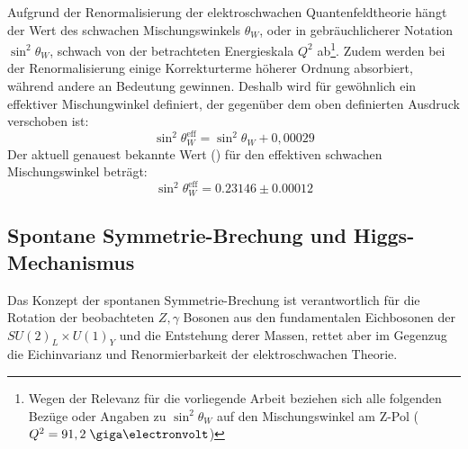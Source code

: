 Aufgrund der Renormalisierung der elektroschwachen Quantenfeldtheorie hängt der
Wert des schwachen Mischungswinkels $\theta_W$, oder in gebräuchlicherer
Notation $\sin^2\theta_W$, schwach von der betrachteten Energieskala $Q^2$
ab\footnote{Wegen der Relevanz für die vorliegende Arbeit beziehen sich alle
folgenden Bezüge oder Angaben zu $\sin^2\theta_W$ auf den Mischungswinkel am
Z-Pol ($Q^2=91,2\GeV$)}. Zudem werden bei der Renormalisierung einige
Korrekturterme höherer Ordnung absorbiert, während andere an Bedeutung
gewinnen. Deshalb wird für gewöhnlich ein effektiver Mischungwinkel definiert,
der gegenüber dem oben definierten Ausdruck verschoben ist:
\begin{equation}
    \sin^2\theta_W^\text{eff} = \sin^2\theta_W + 0,00029
    \label{eq:effective_angle}
\end{equation}
Der aktuell genauest bekannte Wert (\cite{PhysRevD.86.010001}) für den
effektiven schwachen Mischungswinkel beträgt:
\begin{equation}
    \sin^2\theta_W^\text{eff} = 0.23146 \pm 0.00012
    \label{eq:literature_value}
\end{equation}



\subsection{Spontane Symmetrie-Brechung und Higgs-Mechanismus}
Das Konzept der spontanen Symmetrie-Brechung ist verantwortlich für die
Rotation der beobachteten $Z, \gamma$ Bosonen aus den fundamentalen Eichbosonen
der $SU(2)_L \times U(1)_Y$ und die Entstehung derer Massen, rettet aber im
Gegenzug die Eichinvarianz und Renormierbarkeit der elektroschwachen Theorie.

